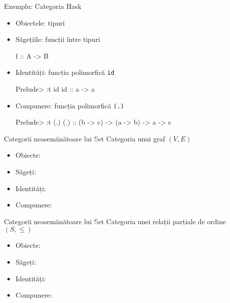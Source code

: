 \documentclass[xcolor=pdftex,romanian,colorlinks]{beamer}
\begin{document}
\begin{frame}[fragile]{Exemplu: Categoria Hask}
\begin{itemize}
\item Obiectele: tipuri
\item Săgețiile: funcții între tipuri
\begin{asciihs}
f :: A -> B
\end{asciihs}
\item Identități: funcția polimorfică \lstinline$id$
\begin{asciihs}
Prelude> :t id
id :: a -> a
\end{asciihs}
\item Compunere: funcția polimorfică \lstinline$(.)$
\begin{asciihs}
Prelude> :t (.)
(.) :: (b -> c) -> (a -> b) -> a -> c
\end{asciihs}
\end{itemize}
\end{frame}


\begin{frame}{Categorii neasemănătoare lui $\mathrm{\mathbb{S}et}$}
{Categoria unui graf $(V,E)$}
\begin{itemize}
\item Obiecte: 
\item Săgeți: 
\item Identități:  
\item Compunere: 
\end{itemize}
\end{frame}

\begin{frame}{Categorii neasemănătoare lui $\mathrm{\mathbb{S}et}$}
{Categoria unei relații parțiale de ordine $(S,\leq)$}
\begin{itemize}
\item Obiecte: 
\item Săgeți: 
\item Identități:  
\item Compunere: 
\end{itemize}
\end{frame}
\end{document}
